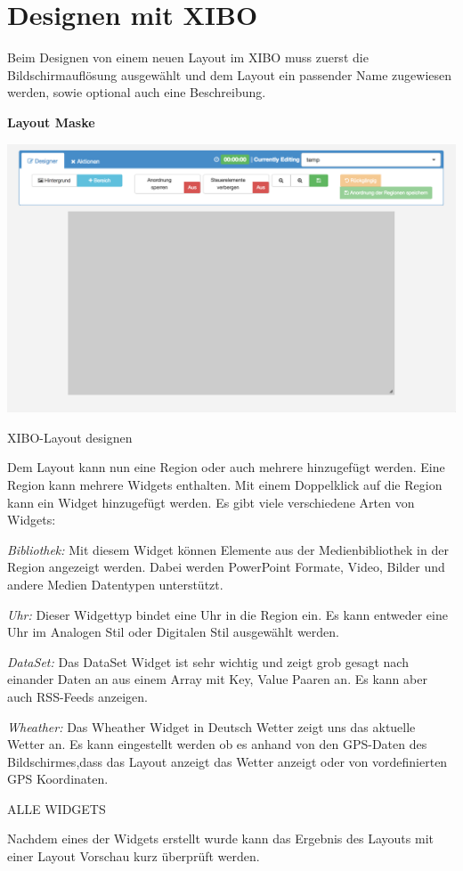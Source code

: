 \section{Designen mit XIBO}\label{sec:designexibo}
Beim Designen von einem neuen Layout im XIBO muss zuerst die Bildschirmauflösung ausgewählt und dem Layout ein passender Name zugewiesen werden, sowie optional auch eine Beschreibung. 

\textbf{Layout Maske}

\begin{calendar}
	\centering
\includegraphics[width=1\textwidth]{images/xibo-basics-designer}
	\label{img:designeLayout}
	\caption{XIBO-Layout designen}
\end{calendar}	

Dem Layout kann nun eine Region oder auch mehrere  hinzugefügt werden. Eine Region kann mehrere Widgets enthalten. Mit einem Doppelklick auf die Region kann ein Widget hinzugefügt werden. Es gibt viele verschiedene Arten von Widgets:

\begin{widgettypes}
	\item {\em Bibliothek:} Mit diesem Widget können Elemente aus der Medienbibliothek in der Region angezeigt werden. Dabei werden PowerPoint Formate, Video, Bilder und andere Medien Datentypen unterstützt.
	
	\item {\em Uhr:} 
	Dieser Widgettyp bindet eine Uhr in die Region ein. Es kann entweder eine Uhr im Analogen Stil oder Digitalen Stil ausgewählt werden.
	
	\item {\em DataSet:} 
	Das DataSet Widget ist sehr wichtig und zeigt grob gesagt nach einander Daten an aus einem Array mit Key, Value Paaren an. Es kann aber auch RSS-Feeds anzeigen.
	
	\item {\em Wheather:} 
	Das Wheather Widget in Deutsch Wetter zeigt uns das aktuelle Wetter an. Es kann eingestellt werden ob es anhand von den GPS-Daten des Bildschirmes,dass das Layout anzeigt das Wetter anzeigt oder von vordefinierten GPS Koordinaten.
	
	ALLE WIDGETS
\end{widgettypes}

Nachdem eines der Widgets erstellt wurde kann das Ergebnis des Layouts mit einer Layout Vorschau kurz überprüft werden.
